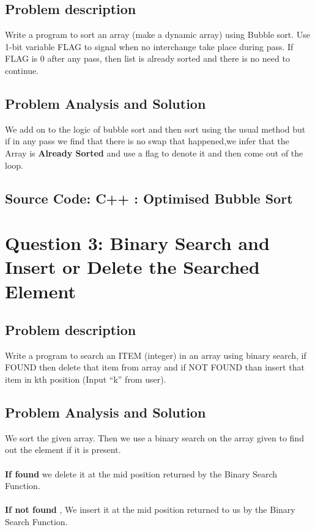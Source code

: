 \documentclass[a4paper]{article}
\begin{document}
\subsection{Problem description}
\large
Write a program to sort an array (make a dynamic array) using Bubble sort. Use 1-bit variable FLAG to signal when no interchange take place during pass. If FLAG is 0 after any pass, then list is already sorted and there is no need to continue.


\subsection{Problem Analysis and Solution}

We add on to the logic of bubble sort and then sort using the usual method but if in any pass we find that there is no swap that happened,we infer that the Array is \textbf{Already Sorted} and use a flag to denote it and then come out of the loop.\\

\subsection{Source Code: C++ : Optimised Bubble Sort}




\clearpage

\hspace{-2pt}
\section{\hspace{-0.5em}\textbf{ Question 3}: Binary Search and Insert or Delete the Searched Element}

\subsection{Problem description}
\large
 Write a program to search an ITEM (integer) in an array using binary search, if FOUND then delete that item from array and if NOT FOUND than insert that item in kth position (Input “k” from user).
 
\subsection{Problem Analysis and Solution}

We sort the given array. Then we use a binary search on the array given to find out the element if it is present.
\\ \\
\textbf{If found} we delete it at the mid position returned by the Binary Search Function.
\\ \\
\textbf{If not found} , We insert it at the mid position returned to us by the Binary Search Function.
\\
\end{document}
